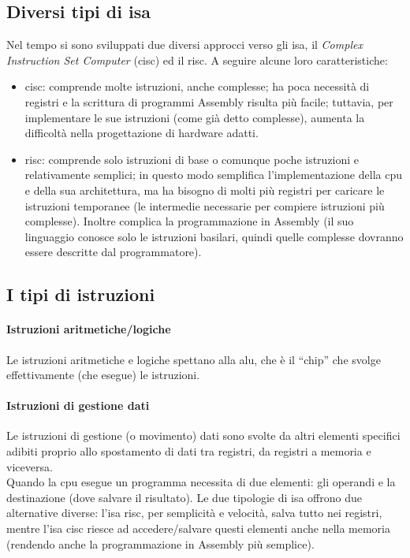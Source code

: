 \documentclass[class=book, crop=false, oneside]{standalone}
\begin{document}
\subsection{Diversi tipi di \acrshort{isa}}
Nel tempo si sono sviluppati due diversi approcci verso  gli \acrshort{isa}, il \emph{Complex Instruction Set Computer} (\acrshort{cisc}) ed il \acrfull{risc}. A seguire alcune loro caratteristiche:
\begin{itemize}
	\item \acrshort{cisc}: comprende molte istruzioni, anche complesse; ha poca necessità di registri e la scrittura di programmi Assembly risulta più facile; tuttavia, per implementare le sue istruzioni (come già detto complesse), aumenta la difficoltà nella progettazione di hardware adatti.
	\item \acrshort{risc}: comprende solo istruzioni di base o comunque poche istruzioni e relativamente semplici; in questo modo semplifica l’implementazione della \acrshort{cpu} e della sua architettura, ma ha bisogno di molti più registri per caricare le istruzioni temporanee (le intermedie necessarie per compiere istruzioni più complesse). Inoltre complica la programmazione in Assembly (il suo linguaggio conosce solo le istruzioni basilari, quindi quelle complesse dovranno essere descritte dal programmatore).
\end{itemize}

\subsection{I tipi di istruzioni}

\paragraph*{Istruzioni aritmetiche/logiche}
Le istruzioni aritmetiche e logiche spettano alla \acrfull{alu}, che è il “chip” che svolge effettivamente (che esegue) le istruzioni.

\paragraph*{Istruzioni di gestione dati}
Le istruzioni di gestione (o movimento) dati sono svolte da altri elementi specifici adibiti proprio allo spostamento di dati tra registri, da registri a memoria  e viceversa.\\
Quando la \acrshort{cpu} esegue un programma necessita di due elementi: gli operandi e la destinazione (dove salvare il risultato). Le due tipologie di \acrshort{isa} offrono due alternative diverse: l’\acrshort{isa} \acrshort{risc}, per semplicità  e velocità, salva tutto nei registri, mentre l’\acrshort{isa} \acrshort{cisc} riesce ad accedere/salvare questi elementi anche nella memoria (rendendo anche la programmazione in Assembly più semplice).
\end{document}
